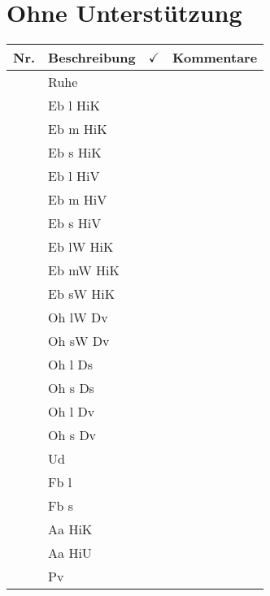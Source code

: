 \documentclass{article}
\newcommand{\incRun}{ \addtocounter{run}{1} }
\newcommand{\nRun}{\incRun \arabic{run}}
\begin{document}
\section{Ohne Unterst\"utzung}
\begin{center}
  \begin{tabular}{ >{\raggedleft} p{} | p{} |p{} |p{}}
    \textbf{Nr.}  & \textbf{Beschreibung} & $\checkmark$ & \textbf{Kommentare}\\ \hline
\nRun & Ruhe & &\\ \hline
\nRun & Eb l HiK & &\\  \hline
\nRun & Eb m HiK & &\\  \hline
\nRun & Eb s HiK & &\\  \hline
\nRun & Eb l HiV & &\\  \hline
\nRun & Eb m HiV & &\\  \hline
\nRun & Eb s HiV & &\\  \hline
\nRun & Eb lW HiK & &\\  \hline
\nRun & Eb mW HiK & &\\  \hline
\nRun & Eb sW HiK & &\\  \hline
\nRun & Oh lW Dv & &\\  \hline
\nRun & Oh sW Dv & &\\  \hline
\nRun & Oh l Ds & &\\  \hline
\nRun & Oh s Ds & &\\  \hline
\nRun & Oh l Dv & &\\  \hline
\nRun & Oh s Dv & &\\  \hline
\nRun & Ud & &\\  \hline
\nRun & Fb l & &\\  \hline
\nRun & Fb s & &\\  \hline
\nRun & Aa HiK & &\\  \hline
\nRun & Aa HiU & &\\  \hline
\nRun & Pv  & &\\ 
  \end{tabular}
\end{center}
\newpage
\end{document}
